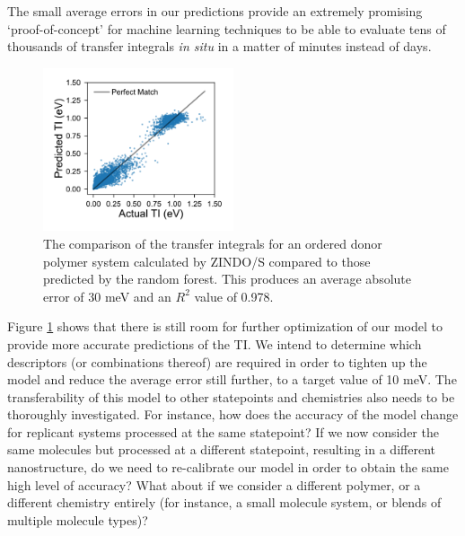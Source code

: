 \documentclass[12pt]{article}
\begin{document}
The small average errors in our predictions provide an extremely promising `proof-of-concept' for machine learning techniques to be able to evaluate tens of thousands of transfer integrals \textit{in situ} in a matter of minutes instead of days.
\begin{figure}\centering
	\includegraphics[width=0.5\textwidth]{Figures/comparison.pdf}
    \caption{
The comparison of the transfer integrals for an ordered donor polymer system calculated by ZINDO/S compared to those predicted by the random forest.
This produces an average absolute error of 30 meV and an $R^2$ value of 0.978.
}
	\label{fig:random_forest_results}
\end{figure}
Figure \ref{fig:random_forest_results} shows that there is still room for further optimization of our model to provide more accurate predictions of the TI.
We intend to determine which descriptors (or combinations thereof) are required in order to tighten up the model and reduce the average error still further, to a target value of 10 meV.
The transferability of this model to other statepoints and chemistries also needs to be thoroughly investigated.
For instance, how does the accuracy of the model change for replicant systems processed at the same statepoint?
If we now consider the same molecules but processed at a different statepoint, resulting in a different nanostructure, do we need to re-calibrate our model in order to obtain the same high level of accuracy?
What about if we consider a different polymer, or a different chemistry entirely (for instance, a small molecule system, or blends of multiple molecule types)?
\end{document}
